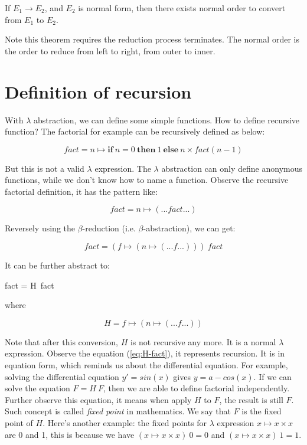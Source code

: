 \documentclass{article}
\begin{document}
\begin{theorem}
If $E_1 \to E_2$, and $E_2$ is normal form, then there exists normal order to convert from $E_1$ to $E_2$.
\end{theorem}

Note this theorem requires the reduction process terminates. The normal order is the order to reduce from left to right, from outer to inner.

\section{Definition of recursion}

With $\lambda$ abstraction, we can define some simple functions. How to define recursive function? The factorial for example can be recursively defined as below:

\[
fact = n \mapsto \textbf{if}\ n = 0\ \textbf{then}\ 1\ \textbf{else}\ n \times fact (n - 1)
\]

But this is not a valid $\lambda$ expression. The $\lambda$ abstraction can only define anonymous functions, while we don't know how to name a function. Observe the recursive factorial definition, it has the pattern like:

\[
fact = n \mapsto (... fact ...)
\]

Reversely using the $\beta$-reduction (i.e. $\beta$-abstraction), we can get:

\[
fact = (f \mapsto (n \mapsto (... f ...)))\ fact
\]

It can be further abstract to:

\be
fact = H\ fact
\label{eq:H-fact}
\ee

where

\[
H = f \mapsto (n \mapsto (... f ...))
\]

Note that after this conversion, $H$ is not recursive any more. It is a normal $\lambda$ expression. Observe the equation (\ref{eq:H-fact}), it represents recursion. It is in equation form, which reminds us about the differential equation. For example, solving the differential equation $y' = sin(x)$ gives $y = a - cos(x)$. If we can solve the equation $F = H\ F$, then we are able to define factorial independently. Further observe this equation, it means when apply $H$ to $F$, the result is still $F$. Such concept is called {\em fixed point} in mathematics. We say that $F$ is the fixed point of $H$. Here's another example: the fixed points for $\lambda$ expression $x \mapsto x \times x$ are 0 and 1, this is because we have $(x \mapsto x \times x)\ 0 = 0$ and $(x \mapsto x \times x)\ 1 = 1$.
\end{document}
